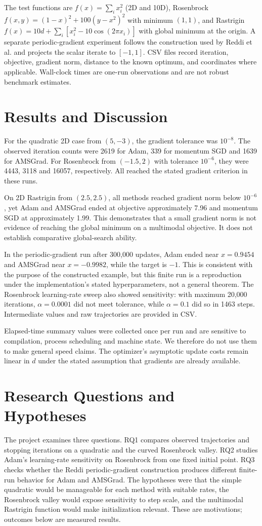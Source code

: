 \documentclass[conference]{IEEEtran}
\begin{document}
The test functions are $f(x)=\sum_i x_i^2$ (2D and 10D), Rosenbrock $f(x,y)=(1-x)^2+100(y-x^2)^2$ with minimum $(1,1)$, and Rastrigin $f(x)=10d+\sum_i[x_i^2-10\cos(2\pi x_i)]$ with global minimum at the origin. A separate periodic-gradient experiment follows the construction used by Reddi et al. and projects the scalar iterate to $[-1,1]$. CSV files record iteration, objective, gradient norm, distance to the known optimum, and coordinates where applicable. Wall-clock times are one-run observations and are not robust benchmark estimates.
\section{Results and Discussion}
For the quadratic 2D case from $(5,-3)$, the gradient tolerance was $10^{-8}$. The observed iteration counts were 2619 for Adam, 339 for momentum SGD and 1639 for AMSGrad. For Rosenbrock from $(-1.5,2)$ with tolerance $10^{-6}$, they were 4443, 3118 and 16057, respectively. All reached the stated gradient criterion in these runs.

On 2D Rastrigin from $(2.5,2.5)$, all methods reached gradient norm below $10^{-6}$, yet Adam and AMSGrad ended at objective approximately 7.96 and momentum SGD at approximately 1.99. This demonstrates that a small gradient norm is not evidence of reaching the global minimum on a multimodal objective. It does not establish comparative global-search ability.

In the periodic-gradient run after 300,000 updates, Adam ended near $x=0.9454$ and AMSGrad near $x=-0.9982$, while the target is $-1$. This is consistent with the purpose of the constructed example, but this finite run is a reproduction under the implementation's stated hyperparameters, not a general theorem. The Rosenbrock learning-rate sweep also showed sensitivity: with maximum 20,000 iterations, $\alpha=0.0001$ did not meet tolerance, while $\alpha=0.1$ did so in 1463 steps. Intermediate values and raw trajectories are provided in CSV.

Elapsed-time summary values were collected once per run and are sensitive to compilation, process scheduling and machine state. We therefore do not use them to make general speed claims. The optimizer's asymptotic update costs remain linear in $d$ under the stated assumption that gradients are already available.
\section{Research Questions and Hypotheses}
The project examines three questions. RQ1 compares observed trajectories and stopping iterations on a quadratic and the curved Rosenbrock valley. RQ2 studies Adam's learning-rate sensitivity on Rosenbrock from one fixed initial point. RQ3 checks whether the Reddi periodic-gradient construction produces different finite-run behavior for Adam and AMSGrad. The hypotheses were that the simple quadratic would be manageable for each method with suitable rates, the Rosenbrock valley would expose sensitivity to step scale, and the multimodal Rastrigin function would make initialization relevant. These are motivations; outcomes below are measured results.
\end{document}
